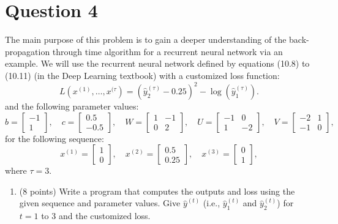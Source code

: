 \documentclass[
	12pt, %
]{../Template/fphw}
\begin{document}

\section*{Question 4}

\begin{problem}
The main purpose of this problem is to gain a deeper understanding of the back-propagation through time algorithm for a recurrent neural network via an example. We will use the recurrent neural network defined by equations (10.8) to (10.11) (in the Deep Learning textbook) with a customized loss function:
\[
L(x^{(1)}, \ldots, x^{(\tau}) = (\hat{y}^{(\tau)}_2 - 0.25)^2 - \log(\hat{y}_{1}^{(\tau)}).
\]
and the following parameter values:
\[
b = \begin{bmatrix} -1 \\ 1 \end{bmatrix}, \quad
c = \begin{bmatrix} 0.5 \\ -0.5 \end{bmatrix}, \quad
W = \begin{bmatrix} 1 & -1 \\ 0 & 2 \end{bmatrix}, \quad
U = \begin{bmatrix} -1 & 0 \\ 1 & -2 \end{bmatrix}, \quad
V = \begin{bmatrix} -2 & 1 \\ -1&0 \end{bmatrix},
\]
for the following sequence:
\[
x^{(1)} = \begin{bmatrix} 1 \\ 0 \end{bmatrix}, \quad
x^{(2)} = \begin{bmatrix} 0.5 \\ 0.25 \end{bmatrix}, \quad
x^{(3)} = \begin{bmatrix} 0 \\ 1 \end{bmatrix},
\]
where \(\tau=3\).
\begin{enumerate}[label=(\arabic*)]
    \item (8 points) Write a program that computes the outputs and loss using the given sequence and parameter values. Give \(\hat{y}^{(t)}\) (i.e., \(\hat{y}^{(t)}_1\) and \(\hat{y}^{(t)}_2\)) for \(t=1\) to 3 and the customized loss.

\end{enumerate}
\end{problem}
\end{document}
